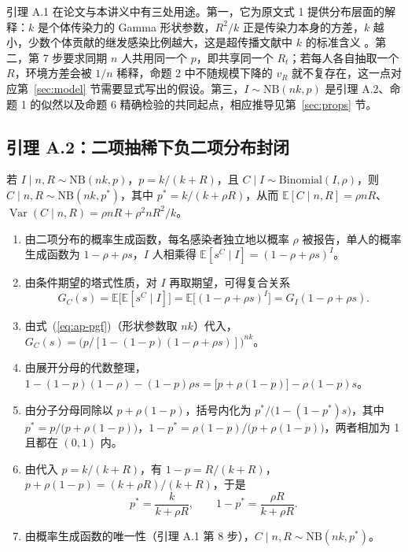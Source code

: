 引理 A.1 在论文与本讲义中有三处用途。第一，它为原文式 1 提供分布层面的解释：$k$ 是个体传染力的 Gamma 形状参数，$R^2/k$ 正是传染力本身的方差，$k$ 越小，少数个体贡献的继发感染比例越大，这是超传播文献中 $k$ 的标准含义 \citep{lloydsmith2005superspreading}。第二，第 7 步要求同期 $n$ 人共用同一个 $p$，即共享同一个 $R_t$；若每人各自抽取一个 $R$，环境方差会被 $1/n$ 稀释，命题 2 中不随规模下降的 $v_R$ 就不复存在，这一点对应第~\ref{sec:model} 节需要显式写出的假设。第三，$I\sim\mathrm{NB}(nk,p)$ 是引理 A.2、命题 1 的似然以及命题 6 精确检验的共同起点，相应推导见第~\ref{sec:props} 节。

\subsection{引理 A.2：二项抽稀下负二项分布封闭}\label{lem:ap-thin}

若 $I\mid n,R\sim\mathrm{NB}(nk,p)$，$p=k/(k+R)$，且 $C\mid I\sim\mathrm{Binomial}(I,\rho)$，则 $C\mid n,R\sim\mathrm{NB}(nk,p^*)$，其中 $p^*=k/(k+\rho R)$，从而 $\mathbb{E}[C\mid n,R]=\rho nR$、$\operatorname{Var}(C\mid n,R)=\rho nR+\rho^2nR^2/k$。

\begin{enumerate}
\item 由二项分布的概率生成函数，每名感染者独立地以概率 $\rho$ 被报告，单人的概率生成函数为 $1-\rho+\rho s$，$I$ 人相乘得 $\mathbb{E}[s^{C}\mid I]=(1-\rho+\rho s)^{I}$。
\item 由条件期望的塔式性质，对 $I$ 再取期望，可得复合关系
\begin{equation}\label{eq:ap-compose}
G_C(s)=\mathbb{E}\big[\mathbb{E}[s^{C}\mid I]\big]=\mathbb{E}\big[(1-\rho+\rho s)^{I}\big]=G_I(1-\rho+\rho s).
\end{equation}
\item 由式~(\ref{eq:ap-pgf})（形状参数取 $nk$）代入，$G_C(s)=\big(p/[1-(1-p)(1-\rho+\rho s)]\big)^{nk}$。
\item 由展开分母的代数整理，$1-(1-p)(1-\rho)-(1-p)\rho s=\big[p+\rho(1-p)\big]-\rho(1-p)s$。
\item 由分子分母同除以 $p+\rho(1-p)$，括号内化为 $p^*/\big(1-(1-p^*)s\big)$，其中 $p^*=p/\big(p+\rho(1-p)\big)$，$1-p^*=\rho(1-p)/\big(p+\rho(1-p)\big)$，两者相加为 1 且都在 $(0,1)$ 内。
\item 由代入 $p=k/(k+R)$，有 $1-p=R/(k+R)$，$p+\rho(1-p)=(k+\rho R)/(k+R)$，于是
\begin{equation}\label{eq:ap-pstar}
p^*=\frac{k}{k+\rho R},\qquad 1-p^*=\frac{\rho R}{k+\rho R}.
\end{equation}
\item 由概率生成函数的唯一性（引理 A.1 第 8 步），$C\mid n,R\sim\mathrm{NB}(nk,p^*)$。
\end{enumerate}

